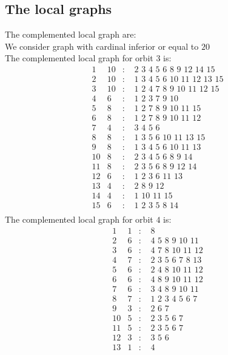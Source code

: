 \documentclass[12pt]{article}
\begin{document}
\subsection{The local graphs}
The complemented local graph are:\\
We consider graph with cardinal inferior or equal to $20$\\
The complemented local graph for orbit $3$ is:
\begin{equation*}
\begin{array}{rrcl}
1&10&:&\,\,2\,\,3\,\,4\,\,5\,\,6\,\,8\,\,9\,\,12\,\,14\,\,15\\
2&10&:&\,\,1\,\,3\,\,4\,\,5\,\,6\,\,10\,\,11\,\,12\,\,13\,\,15\\
3&10&:&\,\,1\,\,2\,\,4\,\,7\,\,8\,\,9\,\,10\,\,11\,\,12\,\,15\\
4&6&:&\,\,1\,\,2\,\,3\,\,7\,\,9\,\,10\\
5&8&:&\,\,1\,\,2\,\,7\,\,8\,\,9\,\,10\,\,11\,\,15\\
6&8&:&\,\,1\,\,2\,\,7\,\,8\,\,9\,\,10\,\,11\,\,12\\
7&4&:&\,\,3\,\,4\,\,5\,\,6\\
8&8&:&\,\,1\,\,3\,\,5\,\,6\,\,10\,\,11\,\,13\,\,15\\
9&8&:&\,\,1\,\,3\,\,4\,\,5\,\,6\,\,10\,\,11\,\,13\\
10&8&:&\,\,2\,\,3\,\,4\,\,5\,\,6\,\,8\,\,9\,\,14\\
11&8&:&\,\,2\,\,3\,\,5\,\,6\,\,8\,\,9\,\,12\,\,14\\
12&6&:&\,\,1\,\,2\,\,3\,\,6\,\,11\,\,13\\
13&4&:&\,\,2\,\,8\,\,9\,\,12\\
14&4&:&\,\,1\,\,10\,\,11\,\,15\\
15&6&:&\,\,1\,\,2\,\,3\,\,5\,\,8\,\,14\\
\end{array}
\end{equation*}
The complemented local graph for orbit $4$ is:
\begin{equation*}
\begin{array}{rrcl}
1&1&:&\,\,8\\
2&6&:&\,\,4\,\,5\,\,8\,\,9\,\,10\,\,11\\
3&6&:&\,\,4\,\,7\,\,8\,\,10\,\,11\,\,12\\
4&7&:&\,\,2\,\,3\,\,5\,\,6\,\,7\,\,8\,\,13\\
5&6&:&\,\,2\,\,4\,\,8\,\,10\,\,11\,\,12\\
6&6&:&\,\,4\,\,8\,\,9\,\,10\,\,11\,\,12\\
7&6&:&\,\,3\,\,4\,\,8\,\,9\,\,10\,\,11\\
8&7&:&\,\,1\,\,2\,\,3\,\,4\,\,5\,\,6\,\,7\\
9&3&:&\,\,2\,\,6\,\,7\\
10&5&:&\,\,2\,\,3\,\,5\,\,6\,\,7\\
11&5&:&\,\,2\,\,3\,\,5\,\,6\,\,7\\
12&3&:&\,\,3\,\,5\,\,6\\
13&1&:&\,\,4\\
\end{array}
\end{equation*}
\end{document}
